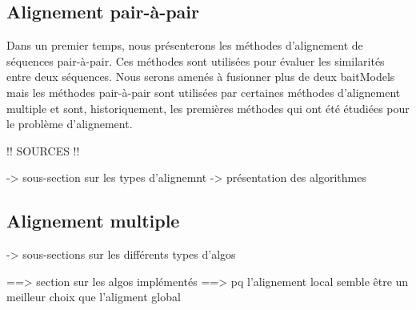 \documentclass[a4paper,12pt]{article}
\begin{document}
\subsection{Alignement pair-à-pair}
Dans un premier temps, nous présenterons les méthodes d'alignement de séquences
pair-à-pair. Ces méthodes sont utilisées pour évaluer les similarités entre
deux séquences. Nous serons amenés à fusionner plus de deux baitModels mais les
méthodes pair-à-pair sont utilisées par certaines méthodes d'alignement
multiple et sont, historiquement, les premières méthodes qui ont été étudiées
pour le problème d'alignement.

!! SOURCES !!

-> sous-section sur les types d'alignemnt
-> présentation des algorithmes

\subsection{Alignement multiple}

-> sous-sections sur les différents types d'algos

==> section sur les algos implémentés
==> pq l'alignement local semble être un meilleur choix que l'aligment global
\end{document}
